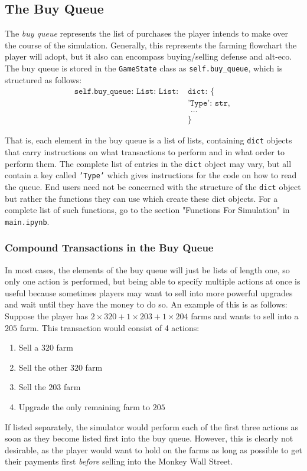 \documentclass[12pt,letterpaper]{article}
\theoremstyle{remark}
\theoremstyle{plain}
\begin{document}
\subsection{The Buy Queue}

The \textit{buy queue} represents the list of purchases the player intends to make over the course of the simulation. Generally, this represents the farming flowchart the player will adopt, but it also can encompass buying/selling defense and alt-eco. The buy queue is stored in the \texttt{GameState} class as \texttt{self.buy\_queue}, which is structured as follows:
\begin{align*}
\texttt{self.buy\_queue: List: List: } & \texttt{dict: \{ }\\
& \texttt{'Type': str, } \\
& \texttt{ \ldots } \\
& \texttt{\}}
\end{align*}

That is, each element in the buy queue is a list of lists, containing \texttt{dict} objects that carry instructions on what transactions to perform and in what order to perform them. The complete list of entries in the \texttt{dict} object may vary, but all contain a key called \texttt{'Type'} which gives instructions for the code on how to read the queue. End users need not be concerned with the structure of the \texttt{dict} object but rather the functions they can use which create these dict objects. For a complete list of such functions, go to the section "Functions For Simulation" in \texttt{main.ipynb}. 

\subsubsection{Compound Transactions in the Buy Queue}

In most cases, the elements of the buy queue will just be lists of length one, so only one action is performed, but being able to specify multiple actions at once is useful because sometimes players may want to sell into more powerful upgrades and wait until they have the money to do so. An example of this is as follows: Suppose the player has $2 \times 320 + 1 \times 203 + 1 \times 204$ farms and wants to sell into a $205$ farm. This transaction would consist of 4 actions:
\begin{enumerate}
	\item Sell a $320$ farm
	\item Sell the other $320$ farm
	\item Sell the $203$ farm
	\item Upgrade the only remaining farm to $205$
\end{enumerate}
If listed separately, the simulator would perform each of the first three actions as soon as they become listed first into the buy queue. However, this is clearly not desirable, as the player would want to hold on the farms as long as possible to get their payments first \textit{before} selling into the Monkey Wall Street. 
\end{document}
